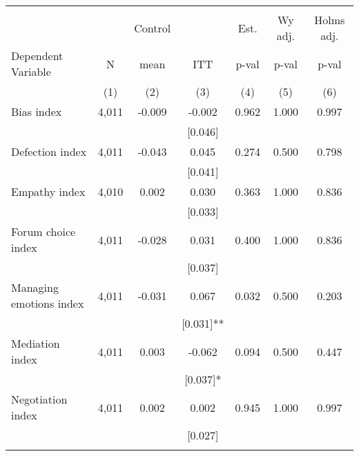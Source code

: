 \begin{tabular}{lcccccc}
\hline \noalign{\smallskip} &  &  &  &  &  & \\
 &  & Control &  & Est. & Wy adj. & Holms adj.\\
Dependent Variable & N & mean & ITT & p-val & p-val & p-val\\
 & (1) & (2) & (3) & (4) & (5) & (6)\\
\noalign{\smallskip}\hline \noalign{\smallskip}Bias index & 4,011 & -0.009 & -0.002 & 0.962 & 1.000 & 0.997\\
 &  &  & [0.046] &  &  & \\
Defection index & 4,011 & -0.043 & 0.045 & 0.274 & 0.500 & 0.798\\
 &  &  & [0.041] &  &  & \\
Empathy index & 4,010 & 0.002 & 0.030 & 0.363 & 1.000 & 0.836\\
 &  &  & [0.033] &  &  & \\
Forum choice index & 4,011 & -0.028 & 0.031 & 0.400 & 1.000 & 0.836\\
 &  &  & [0.037] &  &  & \\
Managing emotions index & 4,011 & -0.031 & 0.067 & 0.032 & 0.500 & 0.203\\
 &  &  & [0.031]** &  &  & \\
Mediation index & 4,011 & 0.003 & -0.062 & 0.094 & 0.500 & 0.447\\
 &  &  & [0.037]* &  &  & \\
Negotiation index & 4,011 & 0.002 & 0.002 & 0.945 & 1.000 & 0.997\\
 &  &  & [0.027] &  &  & \\
\noalign{\smallskip}\hline\end{tabular}
